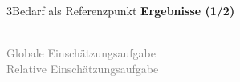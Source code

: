 \documentclass[xcolor=table,9pt,aspectratio=169]{beamer}
\begin{document}
\begin{frame}{\vspace*{10mm}3\hspace*{1em}Bedarf als Referenzpunkt}
\textbf{Ergebnisse (1/2)}\\
\begin{multicols}{2}
   \begin{center}
      \\
      \textcolor{gray}{Globale Einschätzungsaufgabe}
      \\
      \textcolor{gray}{Relative Einschätzungsaufgabe}
   \end{center}

\end{multicols}
\end{frame}
\end{document}
